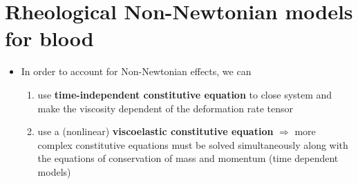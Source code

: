 \documentclass{beamer}
\newtheorem{thm}{Theorem}[theorem]
\begin{document}
	\section[Non-Newtonian Models]{Rheological Non-Newtonian models for blood}	
	
%    	
		            
	
	\begin{frame}%
		\begin{itemize}
			\item In order to account for Non-Newtonian effects, we can
			\begin{enumerate}
				\item use \textbf{time-independent constitutive equation} to close system and make the viscosity dependent of the
deformation rate tensor 
				\item use a (nonlinear) \textbf{viscoelastic constitutive equation} $\Rightarrow$ more complex constitutive equations
must be solved simultaneously along with the equations of conservation of mass and momentum (time dependent models)
\end{enumerate}
		\end{itemize}
		
		
		
	\end{frame}
	
\end{document}
